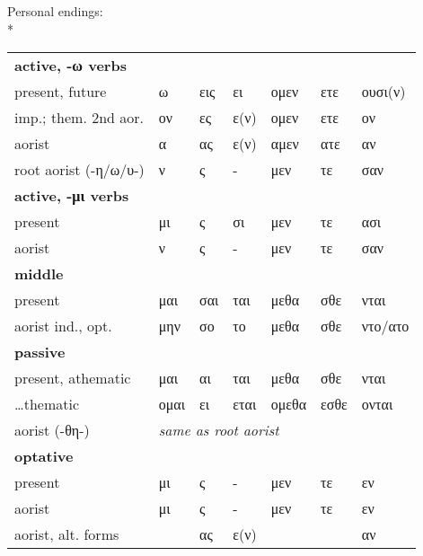 Personal endings:\\*
%
\begin{tabular}{lllllll}
\textbf{active, -ω verbs}\\
present, future              & ω      & εις     & ει        & ομεν    & ετε    & ουσι(ν) \\
imp.; them. 2nd aor.         & ον     & ες      & ε(ν)      & ομεν    &	ετε    & ον \\
aorist                       & α      & ας      & ε(ν)      & αμεν    & ατε    & αν \\
root aorist (-η/ω/υ-)        & ν      & ς       & -         & μεν     & τε     & σαν \\
\textbf{active, -μι verbs}\\
present                      & μι     & ς       & σι        & μεν     & τε     & ασι \\
aorist                       & ν      & ς       & -         & μεν     & τε     & σαν \\
\textbf{middle}\\
present                      & μαι    & σαι     & ται       & μεθα    & σθε    & νται \\
aorist ind., opt.            & μην    & σο      & το        & μεθα    &	σθε    & ντο/ατο\\
\textbf{passive}\\
present, athematic           & μαι    & αι      & ται       & μεθα    & σθε    & νται \\
\ldots thematic              & ομαι   & ει      & εται      & ομεθα   & εσθε   & ονται \\
aorist (-θη-)                & \multicolumn{6}{l}{\emph{same as root aorist}}\\
\textbf{optative}\\
present                      & μι     & ς       & -         & μεν     & τε     & εν \\
aorist                       & μι     & ς       & -         & μεν     & τε     & εν \\
aorist, alt. forms           &        & ας      & ε(ν)      &         &        & αν \\
\end{tabular}



\pagebreak

